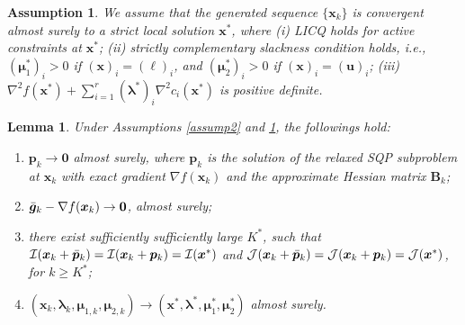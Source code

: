 \documentclass[aos]{imsart}
\numberwithin{equation}{section}
\theoremstyle{plain}
\newtheorem{assumption}{Assumption}
\newtheorem{lemma}{Lemma}
\begin{document}
\begin{assumption}
\label{assump5}
    We assume that the generated sequence $\{\bm{x}_k\}$ is convergent almost surely to a strict local solution $\bm{x}^{*}$, where (i) LICQ holds for active constraints at $\bm{x}^{*}$; (ii) strictly complementary slackness condition holds, i.e., $(\bm{\mu}_{1}^{*})_{i} > 0$ if $(\bm{x})_{i} = (\bm{\ell})_{i}$, and $(\bm{\mu}_{2}^{*})_{i} > 0$ if $(\bm{x})_{i} = (\bm{u})_{i}$; (iii) $\nabla^2 f(\bm{x}^{*}) + \sum_{i=1}^{r} (\bm{\lambda}^{*})_{i} \nabla^2 c_i(\bm{x}^{*})$ is positive definite. 
\end{assumption}


\begin{lemma}
\label{lemma_almost_eq}
    Under Assumptions \ref{assump2} and \ref{assump5}, the followings hold:
    \begin{enumerate}
        \item $\bm{p}_{k} \to \bm{0}$ almost surely, where $\bm{p}_{k}$ is the solution of the relaxed SQP subproblem at $\bm{x}_k$ with exact gradient $\nabla f(\bm{x}_k)$ and the approximate Hessian matrix $\bm{B}_k$;

        \item $\Bar{\bm{g}}_{k} - \nabla f(\bm{x}_k) \to \bm{0}$, almost surely;

        \item there exist  sufficiently sufficiently large $K^{*}$, such that $\mathcal{I}(\bm{x}_k + \Bar{\bm{p}}_k) = \mathcal{I}(\bm{x}_k + \bm{p}_k) = \mathcal{I}(\bm{x}^{*})$ and $\mathcal{J}(\bm{x}_k + \Bar{\bm{p}}_k) = \mathcal{J}(\bm{x}_k + \bm{p}_k) = \mathcal{J}(\bm{x}^{*})$, for $k \geq K^{*}$;

        \item $(\bm{x}_k, \bm{\lambda}_{k},  \bm{\mu}_{1,k}, \bm{\mu}_{2,k}) \to (\bm{x}^{*}, \bm{\lambda}^{*}, \bm{\mu}_{1}^{*} , \bm{\mu}_{2}^{*})$ almost surely.
    \end{enumerate}
\end{lemma}
\end{document}
